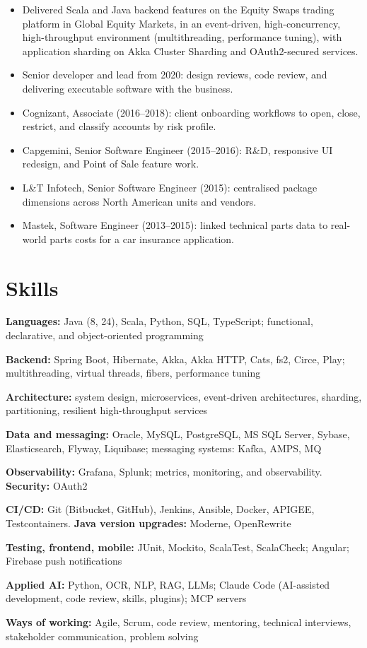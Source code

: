 \documentclass[10pt,a4paper]{article}
\newcommand{\role}[1]{\par\vspace{2.6pt}{\bfseries #1}\par}
\newcommand{\sk}[2]{\textbf{#1:} #2\par}
\begin{document}
\role{Bank of America | Senior Software Engineer, Equity Swaps | Mumbai | Apr 2018 -- May 2022}
\begin{itemize}
  \item Delivered Scala and Java backend features on the Equity Swaps trading platform in Global Equity Markets, in an event-driven, high-concurrency, high-throughput environment (multithreading, performance tuning), with application sharding on Akka Cluster Sharding and OAuth2-secured services.
  \item Senior developer and lead from 2020: design reviews, code review, and delivering executable software with the business.
\end{itemize}
\role{Earlier roles | Mumbai | 2013 -- 2018}
\begin{itemize}
  \item Cognizant, Associate (2016--2018): client onboarding workflows to open, close, restrict, and classify accounts by risk profile.
  \item Capgemini, Senior Software Engineer (2015--2016): R\&D, responsive UI redesign, and Point of Sale feature work.
  \item L\&T Infotech, Senior Software Engineer (2015): centralised package dimensions across North American units and vendors.
  \item Mastek, Software Engineer (2013--2015): linked technical parts data to real-world parts costs for a car insurance application.
\end{itemize}

\section*{Skills}
\sk{Languages}{Java (8, 24), Scala, Python, SQL, TypeScript; functional, declarative, and object-oriented programming}
\sk{Backend}{Spring Boot, Hibernate, Akka, Akka HTTP, Cats, fs2, Circe, Play; multithreading, virtual threads, fibers, performance tuning}
\sk{Architecture}{system design, microservices, event-driven architectures, sharding, partitioning, resilient high-throughput services}
\sk{Data and messaging}{Oracle, MySQL, PostgreSQL, MS SQL Server, Sybase, Elasticsearch, Flyway, Liquibase; messaging systems: Kafka, AMPS, MQ}
\textbf{Observability:} Grafana, Splunk; metrics, monitoring, and observability. \textbf{Security:} OAuth2\par
\textbf{CI/CD:} Git (Bitbucket, GitHub), Jenkins, Ansible, Docker, APIGEE, Testcontainers. \textbf{Java version upgrades:} Moderne, OpenRewrite\par
\sk{Testing, frontend, mobile}{JUnit, Mockito, ScalaTest, ScalaCheck; Angular; Firebase push notifications}
\sk{Applied AI}{Python, OCR, NLP, RAG, LLMs; Claude Code (AI-assisted development, code review, skills, plugins); MCP servers}
\sk{Ways of working}{Agile, Scrum, code review, mentoring, technical interviews, stakeholder communication, problem solving}
\end{document}
